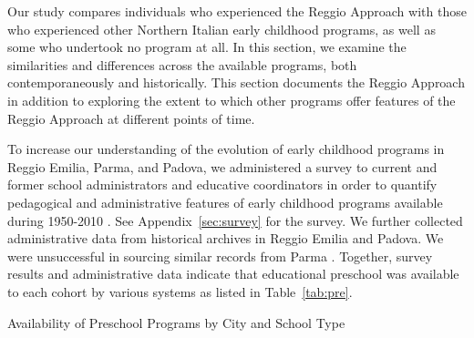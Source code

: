 Our study compares individuals who experienced the Reggio Approach with those who experienced other Northern Italian early childhood programs, as well as some who undertook no program at all. In this section, we examine the similarities and differences across the available programs, both contemporaneously and historically. This section documents the Reggio Approach in addition to exploring the extent to which other programs offer features of the Reggio Approach at different points of time.

To increase our understanding of the evolution of early childhood programs in Reggio Emilia, Parma, and Padova, we administered a survey to current and former school administrators and educative coordinators in order to quantify pedagogical and administrative features of early childhood programs available during 1950-2010 \citep{CEHD_2016_Historical-Analysis}. See Appendix~\ref{sec:survey} for the survey. We further collected administrative data from historical archives in Reggio Emilia and Padova. We were unsuccessful in sourcing similar records from Parma \citep{Padova-Admin-Data_1964-2011,Reggio-Admin-data_1966-2006,Reggio-Annual-Journals_1994-2011}. Together, survey results and administrative data indicate that educational preschool was available to each cohort by various systems as listed in Table~\ref{tab:pre}. 
~\\
\begin{table}[H]
\centering
\caption{Availability of Preschool Programs by City and School Type}\label{tab:pre}
\begin{adjustbox}{width=\textwidth}
\begin{threeparttable}
	
\begin{tablenotes}
\end{tablenotes}
\end{threeparttable}
\end{adjustbox}
\end{table}


	

